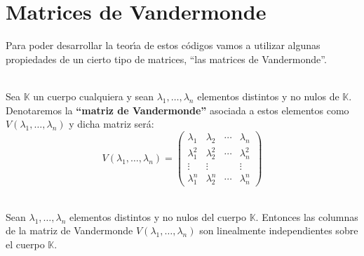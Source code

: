 %
%

\section{Matrices de Vandermonde}

Para poder desarrollar la teor\'{\i}a de estos c\'odigos vamos a utilizar
algunas propiedades de un cierto tipo de matrices, ``las matrices de
Vandermonde''.  
\begin{definicion}
\ \\
Sea $\mathbb{K}$ un cuerpo cualquiera y sean $\lambda_1,\dots,\lambda_n$
elementos distintos y no nulos de $\mathbb{K}$. Denotaremos la \textbf{``matriz
de Vandermonde''} asociada a estos elementos como
$V(\lambda_1,\dots,\lambda_n)$ y dicha matriz ser\'a:
\begin{displaymath}
V(\lambda_1,\dots,\lambda_n) =\left( \begin{array}{cccc}
\lambda_1&\lambda_2&\cdots&\lambda_n\\
\lambda_1^2&\lambda_2^2&\cdots&\lambda_n^2\\
\vdots&\vdots& &\vdots\\
\lambda_1^n&\lambda_2^n&\cdots &\lambda_n^n
\end{array} \right)
\end{displaymath}
\end{definicion}
\begin{teorema}\label{the:Vandermonde}
\ \\
Sean $\lambda_1,\dots,\lambda_n$ elementos distintos y no nulos del cuerpo
$\mathbb{K}$. Entonces las columnas de la matriz de Vandermonde
$V(\lambda_1,\dots,\lambda_n)$ son linealmente independientes sobre el cuerpo
$\mathbb{K}$.
\end{teorema}
